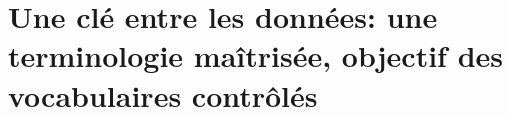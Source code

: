 \section{\label{I-A-2}Une clé entre les données: une terminologie maîtrisée, objectif des vocabulaires contrôlés}